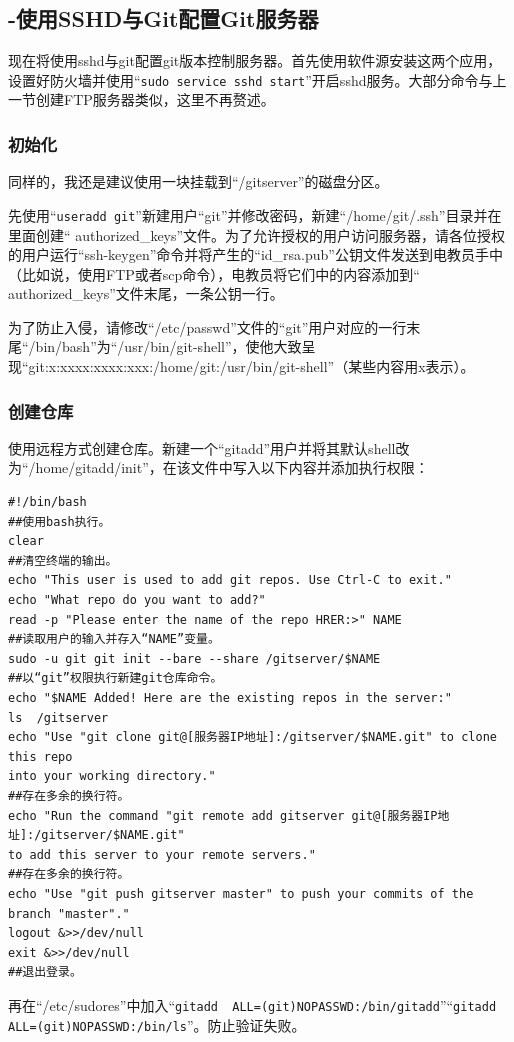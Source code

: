\subsection{-使用SSHD与Git配置Git服务器}
现在将使用sshd与git配置git版本控制服务器。首先使用软件源安装这两个应用，设置好防火墙并使用“\verb|sudo service sshd start|”开启sshd服务。大部分命令与上一节创建FTP服务器类似，这里不再赘述。
\subsubsection{初始化}
同样的，我还是建议使用一块挂载到“/gitserver”的磁盘分区。\par
先使用“\verb|useradd git|”新建用户“git”并修改密码，新建“/home/git/.ssh”目录并在里面创建“ authorized\_keys”文件。为了允许授权的用户访问服务器，请各位授权的用户运行“ssh-keygen”命令并将产生的“id\_rsa.pub”公钥文件发送到电教员手中（比如说，使用FTP或者scp命令），电教员将它们中的内容添加到“ authorized\_keys”文件末尾，一条公钥一行。\par
为了防止入侵，请修改“/etc/passwd”文件的“git”用户对应的一行末尾“/bin/bash”为“/usr/bin/git-shell”，使他大致呈现“git:x:xxxx:xxxx:xxx:/home/git:/usr/bin/git-shell”（某些内容用x表示）。
\subsubsection{创建仓库}
使用远程方式创建仓库。新建一个“gitadd”用户并将其默认shell改为“/home/gitadd/init”，在该文件中写入以下内容并添加执行权限：
\begin{verbatim}
#!/bin/bash
##使用bash执行。
clear
##清空终端的输出。
echo "This user is used to add git repos. Use Ctrl-C to exit."
echo "What repo do you want to add?"
read -p "Please enter the name of the repo HRER:>" NAME
##读取用户的输入并存入“NAME”变量。
sudo -u git git init --bare --share /gitserver/$NAME
##以“git”权限执行新建git仓库命令。
echo "$NAME Added! Here are the existing repos in the server:"
ls  /gitserver
echo "Use "git clone git@[服务器IP地址]:/gitserver/$NAME.git" to clone this repo 
into your working directory."
##存在多余的换行符。
echo "Run the command "git remote add gitserver git@[服务器IP地址]:/gitserver/$NAME.git" 
to add this server to your remote servers."
##存在多余的换行符。
echo "Use "git push gitserver master" to push your commits of the branch "master"."
logout &>>/dev/null
exit &>>/dev/null
##退出登录。
\end{verbatim}
再在“/etc/sudores”中加入“\verb|gitadd  ALL=(git)NOPASSWD:/bin/gitadd|”“\verb|gitadd  ALL=(git)NOPASSWD:/bin/ls|”。防止验证失败。
